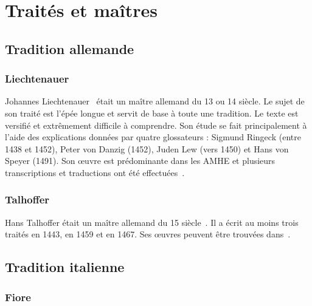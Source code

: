 \chapter{Traités et maîtres}


\section{Tradition allemande}


\subsection{Liechtenauer}
\label{app:maitres:liechtenauer}

Johannes Liechtenauer~\cite{wiktenauer:liechtenauer} était un maître allemand du 13\ieme{} ou 14\ieme{} siècle.
Le sujet de son traité est l'épée longue et servit de base à toute une tradition.
Le texte est versifié et extrêmement difficile à comprendre.
Son étude se fait principalement à l'aide des explications données par quatre glossateurs : Sigmund Ringeck (entre 1438 et 1452), Peter von Danzig (1452), Juden Lew (vers 1450) et Hans von Speyer (1491).
Son œuvre est prédominante dans les AMHE et plusieurs transcriptions et traductions ont été effectuées~\cite{ardamhe:tetraptyque, farrell:ringeck}.



\subsection{Talhoffer}
\label{app:maitres:talhoffer}

Hans Talhoffer était un maître allemand du 15\ieme{} siècle~\cite{wiktenauer:talhoffer}.
Il a écrit au moins trois traités en 1443, en 1459 et en 1467.
Ses œuvres peuvent être trouvées dans~\cite{gaurin:talhoffer:traites}.


\section{Tradition italienne}


\subsection{Fiore}
\label{app:maitres:fiore}

